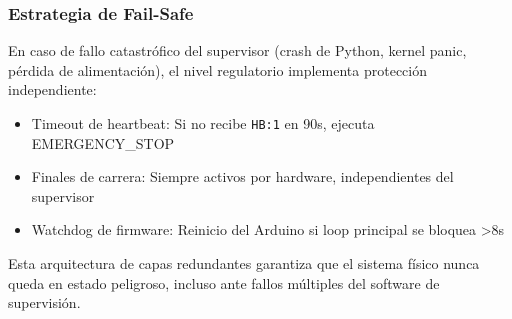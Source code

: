 \subsubsection{Estrategia de Fail-Safe}

En caso de fallo catastrófico del supervisor (crash de Python, kernel panic, pérdida de alimentación), el nivel regulatorio implementa protección independiente:

\begin{itemize}[label=$\bullet$]
    \item Timeout de heartbeat: Si no recibe \texttt{HB:1} en 90s, ejecuta EMERGENCY\_STOP
    \item Finales de carrera: Siempre activos por hardware, independientes del supervisor
    \item Watchdog de firmware: Reinicio del Arduino si loop principal se bloquea >8s
\end{itemize}

Esta arquitectura de capas redundantes garantiza que el sistema físico nunca queda en estado peligroso, incluso ante fallos múltiples del software de supervisión.
